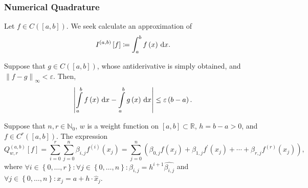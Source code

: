 \begin{frame}
    \frametitle{Numerical Quadrature}

    Let $f\in C\left(\left[a,b\right]\right)$.
    We seek calculate an approximation of
    \begin{equation*}
        I^{\left(a,b\right)}\left[f\right]\coloneqq
        \int_{a}^{b}
        f\left(x\right)
        \dl x.
    \end{equation*}

    Suppose that $g\in C\left(\left[a,b\right]\right)$,
    whose antiderivative is simply obtained, and
    \begin{math}
        {\left\|f-g\right\|}_{\infty}<\varepsilon
    \end{math}.
    Then,
    \begin{equation}
        \left|
        \int\limits_{a}^{b}
        f\left(x\right)
        \dl x-
        \int\limits_{a}^{b}
        g\left(x\right)
        \dl x
        \right|\leq
        \varepsilon\left(b-a\right).
    \end{equation}

    \begin{definition}
        Suppose that $n,r\in\mathbb{N}_{0}$,
        $w$ is a weight function on $\left[a,b\right]\subset\mathbb{R}$,
        $h=b-a>0$, and $f\in C^{r}\left(\left[a,b\right]\right)$.
        The expression
        \begin{equation*}
            Q^{\left(a,b\right)}_{w,r}\left[f\right]=
            \sum\limits_{i=0}^{r}
            \sum\limits_{j=0}^{n}
            \beta_{i,j}
            f^{\left(i\right)}\left(x_{j}\right)=
            \sum\limits_{j=0}^{n}
            \left(
            \beta_{0,j}
            f\left(x_{j}\right)+
            \beta_{1,j}
            f^{\prime}\left(x_{j}\right)+
            \cdots+
            \beta_{r,j}
            f^{\left(r\right)}\left(x_{j}\right)
            \right),
        \end{equation*}
        where
        \begin{math}
            \forall i\in\left\{0,\dotsc,r\right\}:
            \forall j\in\left\{0,\dotsc,n\right\}:
            \beta_{i,j}=
            h^{i+1}
            \widehat{\beta_{i,j}}
        \end{math}
        and
        \begin{math}
            \forall j\in\left\{0,\dotsc,n\right\}:
            x_{j}=
            a+
            h\cdot\widehat{x}_{j}
        \end{math}.
    \end{definition}


\end{frame}

